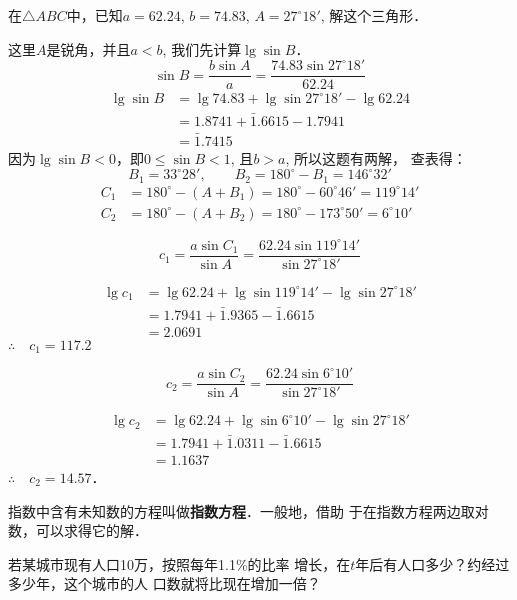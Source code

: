 \begin{example}
    在$\triangle ABC$中，已知$a=62.24$, $b=74.83$, $A=
27^{\circ}18'$, 解这个三角形．
\end{example}

\begin{solution}
    这里$A$是锐角，并且$a<b$, 我们先计算$\lg\sin B$．
\[\sin B=\frac{b\sin A}{a}=\frac{74.83\sin 27^{\circ}18'}{62.24}\]
\[\begin{split}
    \lg\sin B&=\lg 74.83+\lg \sin 27^{\circ}18'-\lg 62.24\\
&=1.8741+\bar{1}.6615-1.7941\\
&=\bar{1}.7415
\end{split}\] 
因为$\lg\sin B<0$，即$0\le \sin B<1$, 且$b>a$, 所以这题有两解，
查表得：
\[B_1=33^{\circ}28',\qquad B_2=180^{\circ}-B_1=146^{\circ}32'\]
\[\begin{split}
    C_1&=180^{\circ}-(A+B_1)=180^{\circ}-60^{\circ}46' =119^{\circ}14' \\
    C_2&=180^{\circ}-(A+B_2)=180^{\circ}-173^{\circ}50'=6^{\circ}10'
\end{split}\]

\[c_1=\frac{a\sin C_1}{\sin A}=\frac{62.24\sin 119^{\circ}14'}{\sin 27^{\circ}18'}\]

\[\begin{split}
    \lg c_1&= \lg 62.24+\lg \sin 119^{\circ}14'-\lg \sin 27^{\circ}18'\\
    &=1.7941+\bar{1}.9365-\bar{1}.6615\\
    &=2.0691
\end{split}\]
$\therefore\quad c_1=117.2$

\[c_2=\frac{a\sin C_2}{\sin A}=\frac{62.24\sin 6^{\circ}10'}{\sin 27^{\circ}18'}\]

\[\begin{split}
    \lg c_2&= \lg 62.24+\lg \sin 6^{\circ}10'-\lg \sin 27^{\circ}18'\\
    &=1.7941+\bar{1}.0311-\bar{1}.6615\\
    &=1.1637
\end{split}\]
$\therefore\quad c_2=14.57$．
\end{solution}  

指数中含有未知数的方程叫做\textbf{指数方程}．一般地，借助
于在指数方程两边取对数，可以求得它的解．

\begin{example}
    若某城市现有人口10万，按照每年1.1\%的比率
    增长，在$t$年后有人口多少？约经过多少年，这个城市的人
    口数就将比现在增加一倍？
\end{example}


